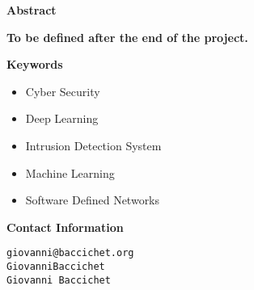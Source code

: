 \thispagestyle{empty}

{\bf\Huge Abstract}

\vspace{1cm}

\faEdit \quad \textbf{To be defined after the end of the project.} \\

\lipsum[1-3]

\vspace{1cm}

{\bf\Huge Keywords}

\vspace{1cm}

\begin{itemize}
    \item Cyber Security
    \item Deep Learning
    \item Intrusion Detection System
    \item Machine Learning
    \item Software Defined Networks
\end{itemize}

\vspace{1cm}

{\bf\Huge Contact Information}

\vspace{1cm}

\faEnvelopeO \quad \texttt{giovanni@baccichet.org} \\

\faGithub \quad \texttt{GiovanniBaccichet} \\

\faLinkedin \quad \texttt{Giovanni Baccichet}